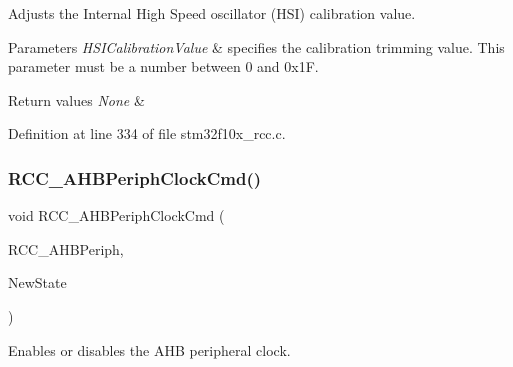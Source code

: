 Adjusts the Internal High Speed oscillator (H\+SI) calibration value. 


\begin{DoxyParams}{Parameters}
{\em H\+S\+I\+Calibration\+Value} & specifies the calibration trimming value. This parameter must be a number between 0 and 0x1F. \\
\hline
\end{DoxyParams}

\begin{DoxyRetVals}{Return values}
{\em None} & \\
\hline
\end{DoxyRetVals}


Definition at line 334 of file stm32f10x\+\_\+rcc.\+c.

\mbox{\label{group___r_c_c___exported___functions_gae0b30d8598b8393bdba9c3fefba3a968}} 
\subsubsection{\texorpdfstring{R\+C\+C\+\_\+\+A\+H\+B\+Periph\+Clock\+Cmd()}{RCC\_AHBPeriphClockCmd()}}
{\footnotesize\ttfamily void R\+C\+C\+\_\+\+A\+H\+B\+Periph\+Clock\+Cmd (\begin{DoxyParamCaption}\item[{uint32\+\_\+t}]{R\+C\+C\+\_\+\+A\+H\+B\+Periph,  }\item[{\hyperlink{group___exported__types_gac9a7e9a35d2513ec15c3b537aaa4fba1}{Functional\+State}}]{New\+State }\end{DoxyParamCaption})}



Enables or disables the A\+HB peripheral clock. 


